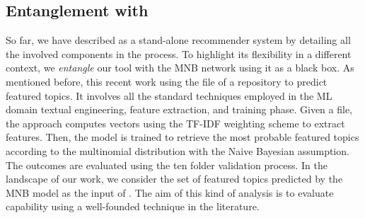 \subsection{Entanglement with \MNB} \label{sec:entangled_approach}

So far, we have described \CT as a stand-alone recommender system by detailing all the involved components in the process. To highlight its flexibility in a different context, we \emph{entangle} our tool with the MNB network using it as a black box. As mentioned before, this recent work using the \RM file of a repository to predict featured topics. It involves all the standard techniques employed in the ML domain \ie textual engineering, feature extraction, and training phase. Given a \RM file, the approach computes vectors using the TF-IDF weighting scheme to extract features. Then, the model is trained to retrieve the most probable featured topics according to the multinomial distribution with the Naive Bayesian assumption. The outcomes are evaluated using the ten folder validation process. In the landscape of our work, we consider the set of featured topics predicted by the MNB model as the input of \CT. The aim of this kind of analysis is to evaluate \CT capability using a well-founded technique in the literature.
